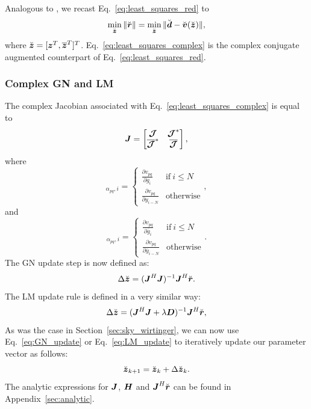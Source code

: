 \documentclass[useAMS,usenatbib]{mn2e}
\newcommand{\bz}{\bmath{z}}
\newcommand{\br}{\bmath{r}}
\newcommand{\bd}{\bmath{d}}
\newcommand{\bv}{\bmath{v}}
\newcommand{\bJ}{\bmath{J}}
\newcommand{\bD}{\bmath{D}}
\newcommand{\bH}{\bmath{H}}
\newcommand{\bmJ}{\bmath{\mathcal{J}}}
\newcommand{\conj}[1]{\overline{#1}}
\begin{document}
Analogous to \cite{Smirnov2015}, we recast Eq.~\eqref{eq:least_squares_red} to 
\begin{equation}
\label{eq:least_squares_complex}
\min_{\breve{\bz}} \|\breve{\br}\| = \min_{\breve{\bz}} \|\breve{\bd} - \breve{\bv}(\breve{\bz})\|, 
\end{equation}
where $\breve{\bz} = [\bz^T,\conj{\bz}^T]^T$. Eq.~\eqref{eq:least_squares_complex} is the complex conjugate augmented counterpart of Eq.~\eqref{eq:least_squares_red}.

\subsubsection{Complex GN and LM}
\label{sec:complex_GN_LM}
The complex Jacobian associated with Eq.~\eqref{eq:least_squares_complex} is equal to
\begin{equation}
\label{eq:Jacobian}
\bJ = \begin{bmatrix}
       \bmJ & \bmJ^*\\
       \conj{\bmJ}^* & \conj{\bmJ} 
      \end{bmatrix},
\end{equation}
where 
\begin{equation}
[\bmJ]_{\alpha_{pq},i} = \begin{cases} 
     \frac{\partial v_{pq}}{\partial g_i} & \textrm{if}~i\leq N \\
     \frac{\partial v_{pq}}{\partial y_{i-N}} & \textrm{otherwise}  
\end{cases}, %
\end{equation}
and
\begin{equation}
[\bmJ^*]_{\alpha_{pq},i} = \begin{cases} 
     \frac{\partial v_{pq}}{\partial \conj{g}_i} & \textrm{if}~i\leq N \\
     \frac{\partial v_{pq}}{\partial \conj{y}_{i-N}} & \textrm{otherwise}  
\end{cases}. %
\end{equation}
The GN update step is now defined as:
\begin{equation}
\label{eq:GN_update}
 \Delta \breve{\bz} = (\bJ^H\bJ)^{-1}\bJ^H\breve{\br}.
\end{equation}
The LM update rule is defined in a very similar way:
\begin{equation}
\label{eq:LM_update}
\Delta \breve{\bz} = (\bJ^H\bJ + \lambda\bD)^{-1}\bJ^H\breve{\br},
\end{equation}
As was the case in Section~\ref{sec:sky_wirtinger}, we can now use Eq.~\eqref{eq:GN_update} or Eq.~\eqref{eq:LM_update} to iteratively update our 
parameter vector as follows:
\begin{equation}
\label{eq:update}
\breve{\bz}_{k+1} = \breve{\bz}_{k} + \Delta \breve{\bz}_{k}. 
\end{equation}
The analytic expressions for $\bJ$, $\bH$ and $\bJ^H\breve{\br}$ can be found in Appendix~\ref{sec:analytic}.
\end{document}
